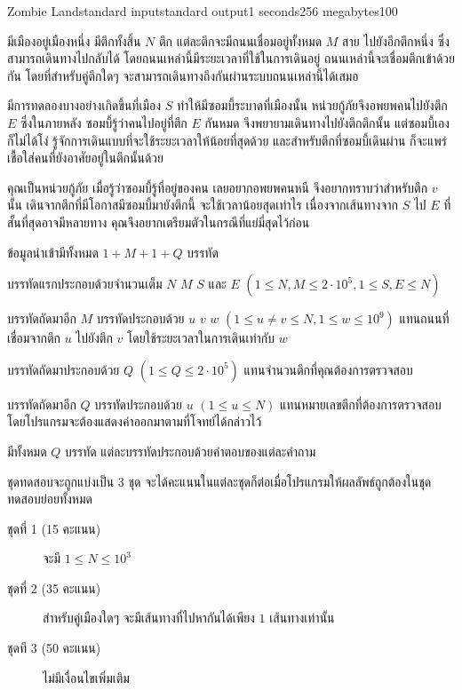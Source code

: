 \documentclass[11pt,a4paper]{article}
\begin{document}
\begin{problem}{Zombie Land}{standard input}{standard output}{1 seconds}{256 megabytes}{100}

มีเมืองอยู่เมืองหนึ่ง มีตึกทั้งสิ้น $N$ ตึก แต่ละตึกจะมีถนนเชื่อมอยู่ทั้งหมด $M$ สาย ไปยังอีกตึกหนึ่ง ซึ่งสามารถเดินทางไปกลับได้ โดยถนนเหล่านี้มีระยะเวลาที่ใช้ในการเดินอยู่ ถนนเหล่านี้จะเชื่อมตึกเข้าด้วยกัน โดยที่สำหรับคู่ตึกใดๆ จะสามารถเดินทางถึงกันผ่านระบบถนนเหล่านี้ได้เสมอ

มีการทดลองบางอย่างเกิดขึ้นที่เมือง $S$ ทำให้มีซอมบี้ระบาดที่เมืองนั้น หน่วยกู้ภัยจึงอพยพคนไปยังตึก $E$ ซึ่งในภายหลัง ซอมบี้รู้ว่าคนไปอยู่ที่ตึก $E$ กันหมด จึงพยายามเดินทางไปยังตึกตึกนั้น แต่ซอมบี้เองก็ไม่ได้โง่ รู้จักการเดินแบบที่จะใช้ระยะเวลาให้น้อยที่สุดด้วย และสำหรับตึกที่ซอมบี้เดินผ่าน ก็จะแพร่เชื้อใส่คนที่ยังอาศัยอยู่ในตึกนั้นด้วย

คุณเป็นหน่วยกู้ภัย เมื่อรู้ว่าซอมบี้รู้ที่อยู่ของคน เลยอยากอพยพคนหนี จึงอยากทราบว่าสำหรับตึก $v$ นั้น เดินจากตึกที่มีโอกาสมีซอมบี้มายังตึกนี้ จะใช้เวลาน้อยสุดเท่าไร เนื่องจากเส้นทางจาก $S$ ไป $E$ ที่สั้นที่สุดอาจมีหลายทาง คุณจึงอยากเตรียมตัวในกรณีที่แย่มี่สุดไว้ก่อน

\InputFile
ข้อมูลนำเข้ามีทั้งหมด $1 + M + 1 + Q$ บรรทัด

บรรทัดแรกประกอบด้วยจำนวนเต็ม $N$ $M$ $S$ และ $E$ $(1 \leq N, M \leq 2 \cdot 10^5, 1 \leq S, E \leq N)$ 

บรรทัดถัดมาอีก $M$ บรรทัดประกอบด้วย $u$ $v$ $w$ $(1 \leq u \neq v \leq N, 1 \leq w \leq 10^9)$ แทนถนนที่เชื่อมจากตึก $u$ ไปยังตึก $v$ โดยใช้ระยะเวลาในการเดินเท่ากับ $w$

บรรทัดถัดมาประกอบด้วย $Q$ $(1 \leq Q \leq 2 \cdot 10^5)$ แทนจำนวนตึกที่คุณต้องการตรวจสอบ

บรรทัดถัดมาอีก $Q$ บรรทัดประกอบด้วย $u$ $(1 \leq u \leq N)$ แทนหมายเลขตึกที่ต้องการตรวจสอบ โดยโปรแกรมจะต้องแสดงค่าออกมาตามที่โจทย์ได้กล่าวไว้

\OutputFile
มีทั้งหมด $Q$ บรรทัด แต่ละบรรทัดประกอบด้วยคำตอบของแต่ละคำถาม

\Scoring
ชุดทดสอบจะถูกแบ่งเป็น 3 ชุด จะได้คะแนนในแต่ละชุดก็ต่อเมื่อโปรแกรมให้ผลลัพธ์ถูกต้องในชุดทดสอบย่อยทั้งหมด

\begin{description}

\item[ชุดที่ 1 (15 คะแนน)] จะมี $ 1 \leq N \leq 10^3 $

\item[ชุดที่ 2 (35 คะแนน)] สำหรับคู่เมืองใดๆ จะมีเส้นทางที่ไปหากันได้เพียง $1$ เส้นทางเท่านั้น

\item[ชุดที 3 (50 คะแนน)] ไม่มีเงื่อนไขเพิ่มเติม

\end{description}

\Examples

\begin{example}
%
\end{example}

\end{problem}
\end{document}
